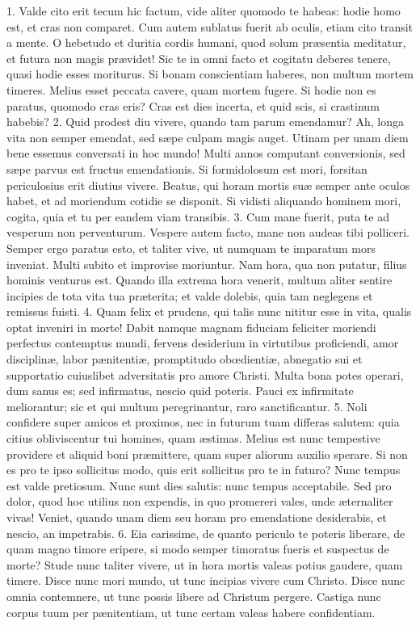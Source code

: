 \documentclass[twoside]{article}
\begin{document}
1. Valde cito erit tecum hic factum, vide aliter quomodo te habeas: hodie homo est, et cras non comparet. Cum autem sublatus fuerit ab oculis, etiam cito transit a mente. O hebetudo et duritia cordis humani, quod solum præsentia meditatur, et futura non magis prævidet! Sic te in omni facto et cogitatu deberes tenere, quasi hodie esses moriturus. Si bonam conscientiam haberes, non multum mortem timeres. Melius esset peccata cavere, quam mortem fugere. Si hodie non es paratus, quomodo cras eris? Cras est dies incerta, et quid scis, si crastinum habebis?
2. Quid prodest diu vivere, quando tam parum emendamur? Ah, longa vita non semper emendat, sed sæpe culpam magis auget. Utinam per unam diem bene essemus conversati in hoc mundo! Multi annos computant conversionis, sed sæpe parvus est fructus emendationis. Si formidolosum est mori, forsitan periculosius erit diutius vivere. Beatus, qui horam mortis suæ semper ante oculos habet, et ad moriendum cotidie se disponit. Si vidisti aliquando hominem mori, cogita, quia et tu per eandem viam transibis.
3. Cum mane fuerit, puta te ad vesperum non perventurum. Vespere autem facto, mane non audeas tibi polliceri. Semper ergo paratus esto, et taliter vive, ut numquam te imparatum mors inveniat. Multi subito et improvise moriuntur. Nam hora, qua non putatur, filius hominis venturus est. Quando illa extrema hora venerit, multum aliter sentire incipies de tota vita tua præterita; et valde dolebis, quia tam neglegens et remissus fuisti.
4. Quam felix et prudens, qui talis nunc nititur esse in vita, qualis optat inveniri in morte! Dabit namque magnam fiduciam feliciter moriendi perfectus contemptus mundi, fervens desiderium in virtutibus proficiendi, amor disciplinæ, labor pænitentiæ, promptitudo obœdientiæ, abnegatio sui et supportatio cuiuslibet adversitatis pro amore Christi. Multa bona potes operari, dum sanus es; sed infirmatus, nescio quid poteris. Pauci ex infirmitate meliorantur; sic et qui multum peregrinantur, raro sanctificantur.
5. Noli confidere super amicos et proximos, nec in futurum tuam differas salutem: quia citius obliviscentur tui homines, quam æstimas. Melius est nunc tempestive providere et aliquid boni præmittere, quam super aliorum auxilio sperare. Si non es pro te ipso sollicitus modo, quis erit sollicitus pro te in futuro? Nunc tempus est valde pretiosum. Nunc sunt dies salutis: nunc tempus acceptabile. Sed pro dolor, quod hoc utilius non expendis, in quo promereri vales, unde æternaliter vivas! Veniet, quando unam diem seu horam pro emendatione desiderabis, et nescio, an impetrabis.
6. Eia carissime, de quanto periculo te poteris liberare, de quam magno timore eripere, si modo semper timoratus fueris et suspectus de morte? Stude nunc taliter vivere, ut in hora mortis valeas potius gaudere, quam timere. Disce nunc mori mundo, ut tunc incipias vivere cum Christo. Disce nunc omnia contemnere, ut tunc possis libere ad Christum pergere. Castiga nunc corpus tuum per pænitentiam, ut tunc certam valeas habere confidentiam.
\end{document}
